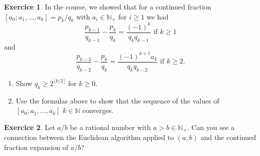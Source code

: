 \documentclass[12pt,a4paper]{article}
\theoremstyle{plain}
\newtheorem*{Sol*}{Solution}
\theoremstyle{definition}
\newtheorem{Ex}{Exercice}
\newif\ifsolutions
\newcommand{\exercise}[2]{
			\begin{Ex} #1 \end{Ex}
			\ifsolutions  \begin{Sol*} #2 \end{Sol*} \bigskip \else \bigskip  \fi
		}
\begin{document}
  \exercise{
    In the course, we showed that for a continued fraction $[a_0;a_1,\dots,a_k] = p_k / q_k$ with $a_i∈ ℕ_+$  for $i≥ 1$  we had
    \begin{displaymath}
      \frac{p_{k-1}}{q_{k-1}} - \frac{p_k}{q_k} = \frac{(-1)^k}{q_k q_{k-1}} \text{ if } k≥1
    \end{displaymath}
    and
    \begin{displaymath}
      \frac{p_{k-2}}{q_{k-2}} - \frac{p_k}{q_k} = \frac{(-1)^{k+1} a_k}{q_k q_{k-2}} \text{ if } k≥2. 
    \end{displaymath}

    \begin{enumerate}
    \item Show  $q_k ≥ 2^{⌊k/2⌋}$ for $k≥ 0$.
      \item Use the formulas above to show that the sequence of the values of $[a_0;a_1,\dots,a_k]$ $k ∈ ℕ$ converges. 
    \end{enumerate}    
  }{
	\begin{enumerate}
		\item The recursive formula for $q_k$ is 
			\[ q_{k+1} = a_{k+1} q_k + q_{k-1}, \]
			which means, since $a_k \geq 1$ for all $k \geq 1$, that $q_{k+1} \geq 2 q_{k-1}$.
	
		\item The first formula shows an exponential decrease in the difference of terms
			\[ |\frac{p_{k-1}}{q_{k-1}} - \frac{p_k}{q_k}| = \frac{1}{q_k q_{k-1}} \leq \frac{1}{2^{\lfloor \frac{k}2 \rfloor + \lfloor \frac{k-1}2 \rfloor }} = \frac{1}{2^{k-1}}. \]
			This implies that the sequence of convergents $\{p_k/q_k\}_k$ is Cauchy: for all $m < n$,
			\[ |\frac{p_{m}}{q_{m}} - \frac{p_n}{q_n}| \leq \sum_{k \geq m} 2^{-k} = 2^{-m+1}, \]
			which is sufficiently small for $m$ large enough.
	\end{enumerate}
	

}


  \exercise{
    Let $a/b$ be a rational number with $a>b ∈ ℕ_+$. Can you see a connection between the Euclidean algorithm applied to $(a,b)$ and the continued fraction expansion of $a/b$? 
  }{
	To construct the continued fraction expansion of $a/b$, we first take its integer part $q \geq 1$.
	This means that $a/b - q$ belongs in $[0,1)$, ie. that
		\[ a - qb = r \in [0, b), \]
	which is exactly the Euclidian division of $a$ by $b$.

	Next, we take the reciprocal of the difference, and proceed.
		\[ ( a/b - q )^{-1} = b/r. \]
	The roles have now changed: we divide $b$ by the first rest $r$, which gives in turn the second rest $r_2 < r$.
	
	Taking the reciprocal of the difference once again leads to $r/r_2$, and etc until the final rest is $0$.
	This is exactly how the Euclidian algorithm finds the gcd of $a$ and $b$ (being the last nonzero rest).
}
  
\end{document}
